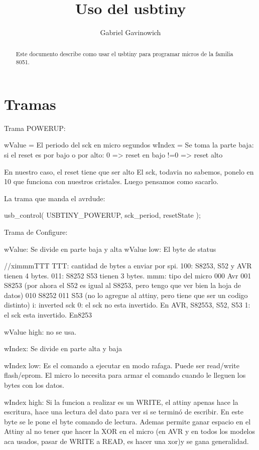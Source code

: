 \documentclass[a4paper,10pt]{article}
\title{Uso del usbtiny}
\author{Gabriel Gavinowich}
\begin{document}
\maketitle
\tableofcontents

\begin{abstract}
Este documento describe como usar el usbtiny para programar micros de la familia 8051.
\end{abstract}

\section{Tramas}


Trama POWERUP:

wValue = El periodo del sck en micro segundos
wIndex = Se toma la parte baja:  si el reset es por bajo o por alto:   0 => reset en bajo
					       !=0  => reset alto

En nuestro caso, el reset tiene que ser alto 
El sck, todavia no sabemos, ponelo en 10 que funciona con nuestros cristales. Luego pensamos como sacarlo.

La trama que manda el avrdude:

	usb_control( USBTINY_POWERUP, sck_period, resetState );

	
Trama de Configure:

wValue:  Se divide en parte baja y alta
	wValue low: El byte de status

	//ximmmTTT	TTT: cantidad de bytes a enviar por spi. 100: S8253, S52 y AVR tienen 4 bytes. 
								 011: S8252 S53 tienen 3 bytes.
			mmm: tipo del micro		000	Avr
							001     S8253 (por ahora el S52 es igual al S8253, pero tengo que ver bien la hoja de datos)
							010     S8252
							011	S53    (no lo agregue al attiny, pero tiene que ser un codigo distinto)
			i: inverted sck	 		0:      el sck no esta invertido. En AVR, S82553, S52, S53
							1:	el sck esta invertido. En8253

	 wValue high: no se usa.

wIndex:  Se divide en parte alta y baja

	wIndex low:     Es el comando a ejecutar en modo rafaga. Puede ser read/write flash/eprom. El micro lo necesita para armar el comando cuando le lleguen los 
			bytes con los datos.

	wIndex high:	Si la funcion a realizar es un WRITE, el attiny apenas hace la escritura, hace una lectura del dato para ver si se terminó de escribir.
			En este byte se le pone el byte comando de lectura. Ademas permite ganar espacio en el Attiny al no tener que hacer la XOR en el micro (en AVR
			y en todos los modelos aca usados, pasar de WRITE a READ, es hacer una xor)y se gana generalidad.
\end{document}
